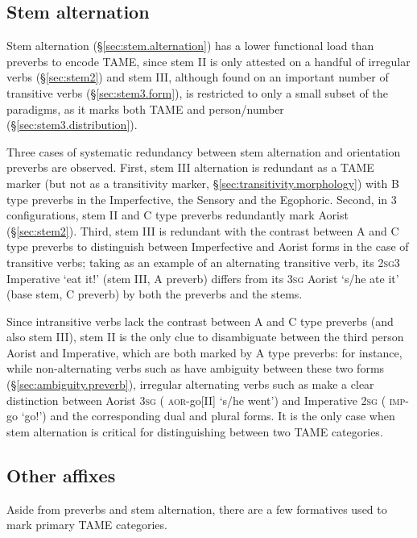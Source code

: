 \subsection{Stem alternation} \label{sec:stem.TAME}
 
Stem alternation (§\ref{sec:stem.alternation}) has a lower functional load than preverbs to encode TAME, since stem II is only attested on a handful of irregular verbs (§\ref{sec:stem2}) and stem III, although found on an important number of transitive verbs (§\ref{sec:stem3.form}), is restricted to only a small subset of the paradigms, as it marks both TAME and person/number (§\ref{sec:stem3.distribution}).

Three cases of systematic redundancy between stem alternation and orientation preverbs are observed. First, stem III alternation is redundant as a TAME marker (but not as a transitivity marker, §\ref{sec:transitivity.morphology}) with B type preverbs in the Imperfective, the Sensory and the Egophoric. Second, in 3\flobv{} configurations, stem II and C type preverbs redundantly mark Aorist (§\ref{sec:stem2}). Third, stem III is redundant with the contrast between A and C type preverbs to distinguish between Imperfective and Aorist forms in the case of transitive verbs; taking  as an example of an alternating transitive verb, its \textsc{2sg}\fl{}3 Imperative  `eat it!' (stem III, A preverb) differs from its \textsc{3sg}\flobv{} Aorist  `s/he ate it' (base stem, C preverb) by both the preverbs and the stems.

Since intransitive verbs lack the contrast between A and C type preverbs (and also stem III), stem II is  the only clue to disambiguate between the third person Aorist and Imperative, which are both marked by A type preverbs: for instance, while non-alternating verbs such as  have ambiguity between these two forms (§\ref{sec:ambiguity.preverb}), irregular alternating verbs such as  make a clear distinction between Aorist \textsc{3sg} ( \textsc{aor}-go[II] `s/he went') and Imperative \textsc{2sg} ( \textsc{imp}-go `go!') and the corresponding dual and plural forms. It is the only case when stem alternation is critical for distinguishing between two TAME categories.


\subsection{Other affixes} \label{sec:other.TAME}
Aside from preverbs and stem alternation, there are a few formatives used to mark primary TAME categories. 

